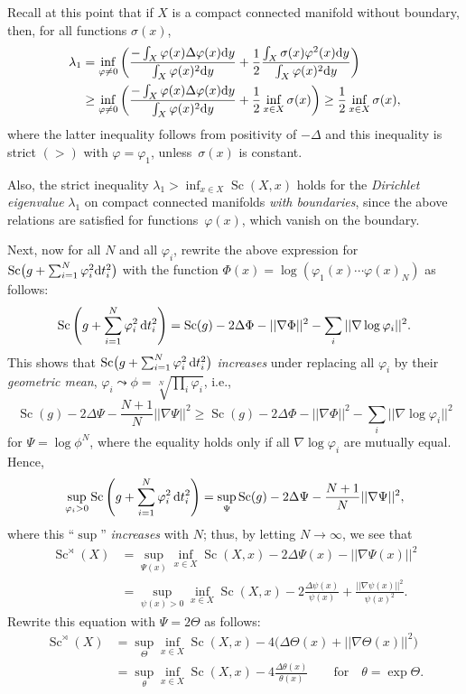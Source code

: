 \documentclass[pdftex]{sigma}
\numberwithin{equation}{section}
\begin{document}
Recall at this point that if $X$ is a compact connected manifold without boundary, then, for all functions $\sigma(x)$,
\begin{align*}
\lambda_1& =\inf_{\varphi\neq 0}\left(\frac {-\int_X\varphi(x) \Delta \varphi(x){\rm d}y} {\int_X\varphi(x)^2{\rm d}y}+
 \frac12\frac {\int_X
 \sigma(x)\varphi^2(x){\rm d}y}{\int_X\varphi(x)^2{\rm d}y} \right)\\
 & \geq
\inf_{\varphi\neq 0}\left(\frac {-\int_X\varphi(x) \Delta \varphi(x){\rm d}y} {\int_X\varphi(x)^2{\rm d}y}+\frac12
 \inf_{x\in X}\sigma(x)\right) \geq \frac12\inf_{x\in X}\sigma(x),
\end{align*}
 where the latter inequality follows from positivity of $-\Delta$ and this inequality is strict $(>)$ with $\varphi=\varphi_1$, unless~$\sigma(x)$ is constant.

Also, the strict inequality $\lambda_1> \inf_{x\in X}\operatorname{Sc}(X,x)$ holds for the {\it Dirichlet eigenvalue} $\lambda_1$
 on compact connected manifolds {\it with boundaries},
 since the above relations
 are satisfied for functions~$\varphi (x)$, which vanish on the boundary.

 Next, now for all $N$ and all $\varphi_i$, rewrite the above expression for $\operatorname{Sc}\bigl(g+\sum_{i=1}^N\varphi_i^2{\rm d}t_i^2\bigr)$
 with the function $\Phi(x)=\log(\varphi_1(x)\cdots \varphi(x)_N)$ as follows:
\[
\operatorname{Sc}\left(g+\sum_{i=1}^N\varphi_i^2\,{\rm d}t_i^2\right)= \operatorname{Sc}(g) -2\Delta\Phi-||\nabla \Phi||^2 -\sum_i{||\nabla\log \varphi_i||^2}.
\]
This shows that
$\operatorname{Sc}\bigl(g+\sum_{i=1}^N\varphi_i^2\,{\rm d}t_i^2\bigr)$ {\it increases} under replacing all $\varphi_i$ by their {\it geometric mean},
$\varphi_i\leadsto \phi= \sqrt[N]{\prod_i\varphi_i}$, i.e.,
\[
\operatorname{Sc}(g)-2\Delta\Psi -\frac {N+1}{N}||\nabla\Psi||^2\geq \operatorname{Sc}(g) -2\Delta\Phi-||\nabla \Phi||^2 -\sum_i||\nabla\log\varphi_i||^2
\]
for $\Psi=\log \phi^N$, where the equality holds only if all $\nabla\log\varphi_i$ are mutually equal.
Hence,
\[
\sup_{\varphi_i>0} \operatorname{Sc}\left(g+\sum_{i=1}^N\varphi_i^2\,{\rm d}t_i^2\right)=\sup_\Psi \operatorname{Sc}(g)-2\Delta\Psi -\frac {N+1}{N}||\nabla\Psi||^2,
\]
where this ``$\sup$'' {\it increases} with $N$; thus,
 by letting $N\to\infty$, we see that
\begin{align*}
\operatorname{Sc}^\rtimes (X)& =\sup_{\Psi(x) }\inf_{x\in X} \operatorname{Sc}(X,x)-2\Delta\Psi(x) -||\nabla\Psi(x)||^2 \\
& = \sup_{\psi(x)>0}\inf_{x\in X} \operatorname{Sc}(X,x)- 2\frac{\Delta\psi(x)} {\psi(x)} +\frac{||\nabla\psi(x)||^2}{\psi(x)^2}.
\end{align*}
Rewrite this equation with $\Psi=2\Theta$ as follows:
\begin{align*}
\operatorname{Sc}^\rtimes (X) & =\sup_{\Theta }\inf_{x\in X} \operatorname{Sc}(X,x)-4\bigl(\Delta\Theta(x) +||\nabla\Theta(x)||^2\bigr)\\
& =
\sup_{\theta }\inf_{x\in X} \operatorname{Sc}(X,x)-4\frac{\Delta\theta(x)} {\theta(x)} \qquad \text{for} \quad \theta=\exp \Theta.
\end{align*}
\end{document}
